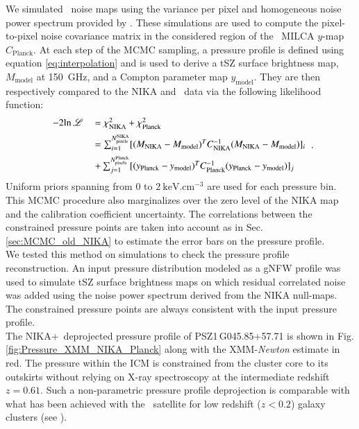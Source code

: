 \documentclass[traditabstract]{aa}
\begin{document}
\indent We simulated \planck\ noise maps using the variance per pixel and homogeneous noise power spectrum provided by \citealt{ymap_planck}. These simulations are used to compute the pixel-to-pixel noise covariance matrix in the considered region of the \planck\ MILCA $y$-map $C_{\mathrm{Planck}}$. At each step of the MCMC sampling, a pressure profile is defined using equation \ref{eq:interpolation} and is used to derive a tSZ surface brightness map, $M_{\mathrm{model}}$ at 150~GHz, and a Compton parameter map $y_{\mathrm{model}}$. They are then respectively compared to the NIKA and \planck\ data via the following likelihood function:
\begin{equation}
\begin{tabular}{rl}
        $-2 \mathrm{ln} \, \mathscr{L}$  & $ =\chi^2_{\mathrm{NIKA}} + \chi^2_{\mathrm{Planck}}$\\[0.2cm]
         &$ =\sum_{i=1}^{N_{\mathrm{pixels}}^{\mathrm{NIKA}}} [(M_{\mathrm{NIKA}} - M_{\mathrm{model}})^T C_{\mathrm{NIKA}}^{-1} (M_{\mathrm{NIKA}} - M_{\mathrm{model}})]_i $ \\[0.2cm]
         & $+ \sum_{j=1}^{N_{\mathrm{pixels}}^{\mathrm{Planck}}} [(y_{\mathrm{Planck}} - y_{\mathrm{model}})^T C_{\mathrm{Planck}}^{-1} (y_{\mathrm{Planck}} - y_{\mathrm{model}})]_j$
\label{eq:chi2_NIKA_Planck}
\end{tabular}
.\end{equation}
Uniform priors spanning from 0 to $2~\mathrm{keV.cm^{-3}}$ are used for each pressure bin. This MCMC procedure also marginalizes over the zero level of the NIKA map and the calibration coefficient uncertainty. The correlations between the constrained pressure points are taken into account as in Sec. \ref{sec:MCMC_old_NIKA} to estimate the error bars on the pressure profile.\\
\indent We tested this method on simulations to check the pressure profile reconstruction. An input pressure distribution modeled as a gNFW profile was used to simulate tSZ surface brightness maps on which residual correlated noise was added using the noise power spectrum derived from the NIKA null-maps. The constrained pressure points are always consistent with the input pressure profile.\\
\indent The NIKA+\planck\ deprojected pressure profile of \mbox{PSZ1\,G045.85+57.71} is shown in Fig. \ref{fig:Pressure_XMM_NIKA_Planck} along with the XMM-{\it Newton} estimate in red. The pressure within the ICM is constrained from the cluster core to its outskirts without relying on X-ray spectroscopy at the intermediate redshift $z=0.61$. Such a non-parametric pressure profile deprojection is comparable with what has been achieved with the \planck\ satellite for low redshift ($z < 0.2$) galaxy clusters (see \citealt{Planck_pressure_prof}).\\
\end{document}
